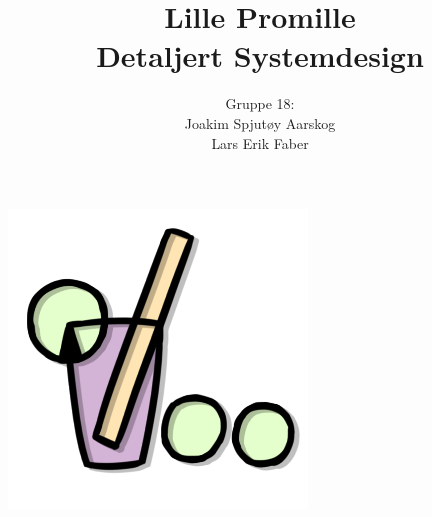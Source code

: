 \documentclass[12pt]{article}
\begin{document}
\title{%
    Lille Promille\\
    \large Detaljert Systemdesign}
\author{
    Gruppe 18:\\
    Joakim Spjutøy Aarskog\\
    Lars Erik Faber}
\date{}
\maketitle
\begin{center}
    \includegraphics[scale=3]{images/lille_promille_logo.png}    
\end{center}
\thispagestyle{empty}
\newpage
\tableofcontents
\thispagestyle{empty}
\newpage
\setcounter{page}{1}







\end{document}
